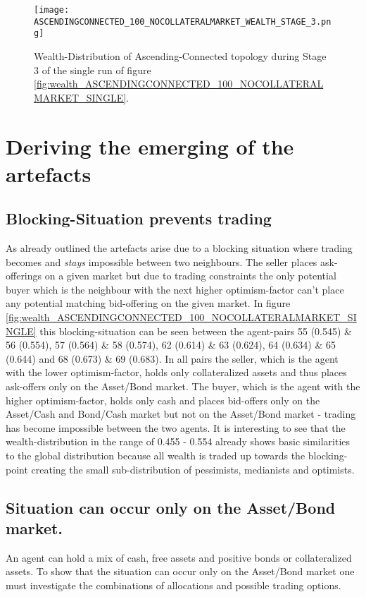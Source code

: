 \documentclass[Bachelorarbeit.tex]{subfiles}
\begin{document}
\begin{figure}[H]
	\centering
  \texttt{[image: ASCENDINGCONNECTED\_100\_NOCOLLATERALMARKET\_WEALTH\_STAGE\_3.png]}
  	\caption{Wealth-Distribution of Ascending-Connected topology during Stage 3 of the single run of figure \ref{fig:wealth_ASCENDINGCONNECTED_100_NOCOLLATERALMARKET_SINGLE}.}
	\label{fig:markets_ASCENDINGCONNECTED_100_NOCOLLATERALMARKET_WEALTH_STAGE_3}
\end{figure}

\section{Deriving the emerging of the artefacts}

\subsection{Blocking-Situation prevents trading} As already outlined the artefacts arise due to a blocking situation where trading becomes and \textit{stays} impossible between two neighbours. The seller places ask-offerings on a given market but due to trading constraints the only potential buyer which is the neighbour with the next higher optimism-factor can't place any potential matching bid-offering on the given market. In figure \ref{fig:wealth_ASCENDINGCONNECTED_100_NOCOLLATERALMARKET_SINGLE} this blocking-situation can be seen between the agent-pairs 55 (0.545) \& 56 (0.554), 57 (0.564) \& 58 (0.574), 62 (0.614) \& 63 (0.624), 64 (0.634) \& 65 (0.644) and 68 (0.673) \& 69 (0.683). In all pairs the seller, which is the agent with the lower optimism-factor, holds only collateralized assets and thus places ask-offers only on the Asset/Bond market. The buyer, which is the agent with the higher optimism-factor, holds only cash and places bid-offers only on the Asset/Cash and Bond/Cash market but not on the Asset/Bond market - trading has become impossible between the two agents. It is interesting to see that the wealth-distribution in the range of 0.455 - 0.554 already shows basic similarities to the global distribution because all wealth is traded up towards the blocking-point creating the small sub-distribution of pessimists, medianists and optimists.

\subsection{Situation can occur only on the Asset/Bond market.} An agent can hold a mix of cash, free assets and positive bonds or collateralized assets. To show that the situation can occur only on the Asset/Bond market one must investigate the combinations of allocations and possible trading options.
\end{document}
